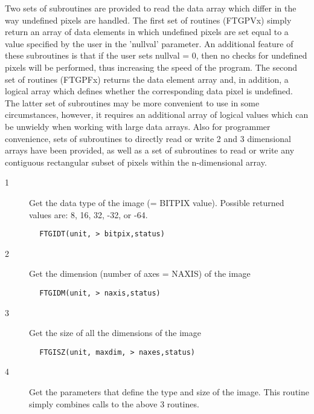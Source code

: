 \documentclass[11pt]{book}
\begin{document}
    Two sets of subroutines are provided to read the data array which
differ in the way undefined pixels are handled.  The first set of
routines (FTGPVx) simply return an array of data elements in which
undefined pixels are set equal to a value specified by the user in the
'nullval' parameter.  An additional feature of these subroutines is
that if the user sets nullval = 0, then no checks for undefined pixels
will be performed, thus increasing the speed of the program.  The
second set of routines (FTGPFx) returns the data element array and, in
addition, a logical array which defines whether the corresponding data
pixel is undefined.  The latter set of subroutines may be more
convenient to use in some circumstances, however, it requires an
additional array of logical values which can be unwieldy when working
with large data arrays.  Also for programmer convenience, sets of
subroutines to directly read or write 2 and 3 dimensional arrays  have
been provided, as well as a set of subroutines to read or write any
contiguous rectangular subset of pixels within the n-dimensional array.


\begin{description}
\item[1 ] Get the data type of the image (= BITPIX value).  Possible returned
   values are: 8, 16, 32, -32, or -64.
\end{description}

\begin{verbatim}
        FTGIDT(unit, > bitpix,status)
\end{verbatim}

\begin{description}
\item[2 ] Get the dimension (number of axes = NAXIS) of the image
\end{description}

\begin{verbatim}
        FTGIDM(unit, > naxis,status)
\end{verbatim}

\begin{description}
\item[3 ] Get the size of all the dimensions of the image
\end{description}

\begin{verbatim}
        FTGISZ(unit, maxdim, > naxes,status)
\end{verbatim}

\begin{description}
\item[4 ]  Get the parameters that define the type and size of the image.  This
    routine simply combines calls to the above 3 routines.
\end{description}
\end{document}
